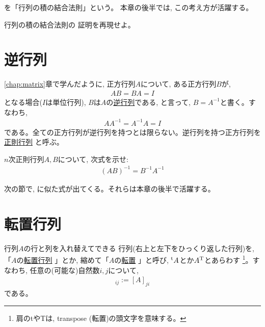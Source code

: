 を「行列の積の結合法則」という。
本章の後半では, この考え方が活躍する。

\begin{q}\label{q:invmatrix_product3} 行列の積の結合法則の
証明を再現せよ。
\end{q}
\mv

\section{逆行列}

\ref{chap:matrix}章で学んだように, 正方行列$A$について, ある正方行列$B$が, 
\begin{eqnarray}AB=BA=I\end{eqnarray}
となる場合($I$は単位行列), $B$は$A$の\underline{逆行列}である, 
と言って, $B=A^{-1}$と書く。すなわち, 
\begin{eqnarray}AA^{-1}=A^{-1}A=I\label{eq:matrix_inverse}\end{eqnarray}
である。全ての正方行列が逆行列を持つとは限らない。逆行列を持つ正方行列を\underline{正則行列}
と呼ぶ。

\begin{q}\label{q:invmatrix_product} $n$次正則行列$A, B$について, 次式を示せ:
\begin{eqnarray}(AB)^{-1}=B^{-1}A^{-1}\label{eq:ABinverse}\end{eqnarray}
\end{q}

次の節で, に似た式が出てくる。それらは本章の後半で活躍する。\\
\mv

\section{転置行列}

行列$A$の行と列を入れ替えてできる
行列(右上と左下をひっくり返した行列)を, 「$A$の\underline{転置行列}
 」とか, 縮めて「$A$の\underline{転置} 
」と呼び, $^{\text t}A$とか$A^{\text T}$とあらわす
\footnote{肩のtやTは, transpose (転置)の頭文字を意味する。}。すなわち, 
任意の(可能な)自然数$i, j$について, 
\begin{eqnarray}
[^{\text t}A]_{ij}:=[A]_{ji}\label{eq:def_transpose_component}
\end{eqnarray}
である。

